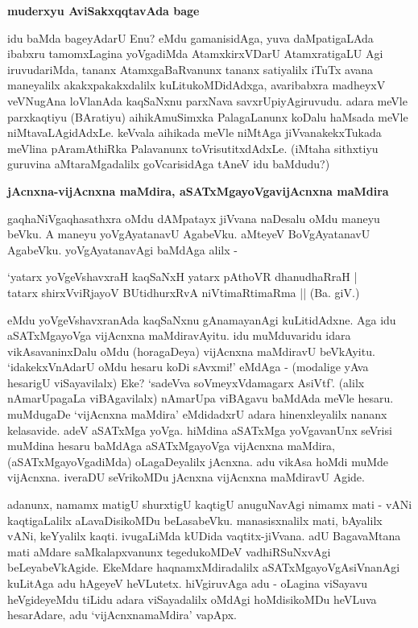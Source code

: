 {\bigskip
\noindent
{\large\bf muderxyu AviSakxqqtavAda bage}}\label{page73}
\medskip

\noindent
idu baMda bageyAdarU Enu? eMdu gamanisidAga, yuva daMpatigaLAda ibabxru tamomxLagina yoVgadiMda AtamxkirxVDarU AtamxratigaLU Agi iruvudariMda, tananx AtamxgaBaRvanunx tananx satiyalilx iTuTx avana maneyalilx akakxpakakxdalilx kuLitukoMDidAdxga, avaribabxra madheyxV veVNugAna loVlanAda kaqSaNxnu parxNava savxrUpiyAgiruvudu. adara meVle parxkaqtiyu (BAratiyu) aihikAmuSimxka PalagaLanunx koDalu haMsada meVle niMtavaLAgidAdxLe. keVvala aihikada meVle niMtAga jiVvanakekxTukada meVlina pAramAthiRka Palavanunx toVrisutitxdAdxLe. (iMtaha sithxtiyu guruvina aMtaraMgadalilx goVcarisidAga tAneV idu baMdudu?)

{\bigskip
\noindent
{\large\bf jAcnxna-vijAcnxna maMdira, aSATxMgayoVgavijAcnxna maMdira}}\label{page73}
\medskip

\noindent
gaqhaNiVgaqhasathxra oMdu dAMpatayx jiVvana naDesalu oMdu maneyu beVku. A maneyu yoVgAya\-tanavU AgabeVku. aMteyeV BoVgAyatanavU AgabeVku. yoVgAyatanavAgi baMdAga alilx -

\smallskip
\begin{shloka}
`yatarx yoVgeVshavxraH kaqSaNxH yatarx pAthoVR dhanudhaRraH |\\\label{73}
tatarx shirxVviRjayoV BUtidhurxRvA niVtimaRtimaRma || \hfill{(Ba. giV.)}
\end{shloka}
\smallskip

eMdu yoVgeVshavxranAda kaqSaNxnu gAnamayanAgi kuLitidAdxne. Aga idu aSATxMgayoVga vijAcnxna\- maMdi\-ravAyitu. idu muMduvaridu idara vikAsavaninxDalu oMdu (horagaDeya) vijAcnxna maMdi\-ravU beVkAyitu. `idakekxVnAdarU oMdu hesaru koDi sAvxmi!' eMdAga - (modalige yAva hesarigU viSayavilalx) Eke? `sadeVva soVmeyxVdamagarx AsiVtf'\label{74}. (alilx nAmarUpagaLa viBAgavilalx) nAmarUpa viBAgavu baMdAda meVle hesaru. muMdugaDe `vijAcnxna maMdira' eMdidadxrU adara hinenxle\-yalilx nananx kelasavide. adeV aSATxMga yoVga. hiMdina aSATxMga yoVgavanUnx seVrisi muMdina hesaru baMdAga aSATxMgayoVga vijAcnxna maMdira, (aSATxMgayoVgadiMda) oLagaDeyalilx jAcnxna. adu vikAsa hoMdi muMde vijAcnxna. iveraDU seVrikoMDu jAcnxna vijAcnxna maMdiravU Agide.

adanunx, namamx matigU shurxtigU kaqtigU anuguNavAgi nimamx mati - vANi kaqtigaLalilx aLa\-vaDisi\-koMDu beLasabeVku. manasisxnalilx mati, bAyalilx vANi, keYyalilx kaqti. ivugaLiMda kUDida vaqtitx-jiVvana. adU BagavaMtana mati aMdare saMkalapxvanunx tegedukoMDeV vadhiRSuNxvAgi beLeyabeVkAgide. EkeM\-dare haqnamxM\-diradalilx aSATxMgayoVgAsiVnanAgi kuLitAga adu hAgeyeV heVLutetx. hiVgiruvAga adu - oLagina viSayavu heVgideyeMdu tiLidu adara viSayadalilx oMdAgi hoMdisikoMDu heVLuva hesarAdare, adu `vijAcnxnamaMdira' vapApx.

